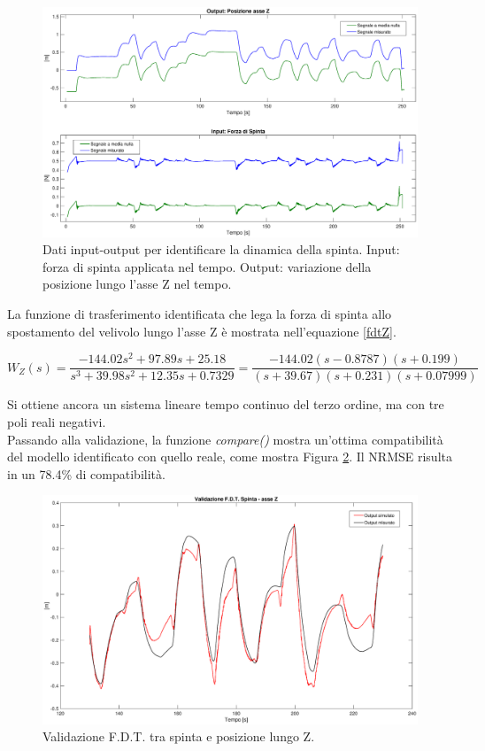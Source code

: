 \begin{figure}[H]
	\centering
	\includegraphics[width=1\textwidth]{gfx/SysId/tzinput}
	\caption[Dati input-output per identificare la dinamica della spinta.]{Dati input-output per identificare la dinamica della spinta. Input: forza di spinta applicata nel tempo. Output: variazione della posizione lungo l'asse Z nel tempo.}
	\label{fig:tz_input}
\end{figure}

La funzione di trasferimento identificata che lega la forza di spinta allo spostamento del velivolo lungo l'asse Z è mostrata nell'equazione \ref{fdtZ}.

\begin{equation}
	W_Z(s) = \frac{-144.02s^2 + 97.89s + 25.18}{s^3 + 39.98s^2 + 12.35s + 0.7329}
	= \frac{-144.02(s-0.8787)(s+0.199)}{(s+39.67)(s+0.231)(s+0.07999)}
	\label{fdtZ}
\end{equation}

Si ottiene ancora un sistema lineare tempo continuo del terzo ordine, ma con tre poli reali negativi.\\

Passando alla validazione, la funzione \emph{compare()} \cite{compare} mostra un'ottima compatibilità del modello identificato con quello reale, come mostra Figura \ref{fig:tz_model}. Il \acs{NRMSE} risulta in un 78.4\% di compatibilità.

\begin{figure}[H]
	\centering
	\includegraphics[width=1\textwidth]{gfx/SysId/tzmodel}
	\caption[Validazione F.D.T. Spinta e posizione lungo Z.]{Validazione F.D.T. tra spinta e posizione lungo Z.}
	\label{fig:tz_model}
\end{figure}

